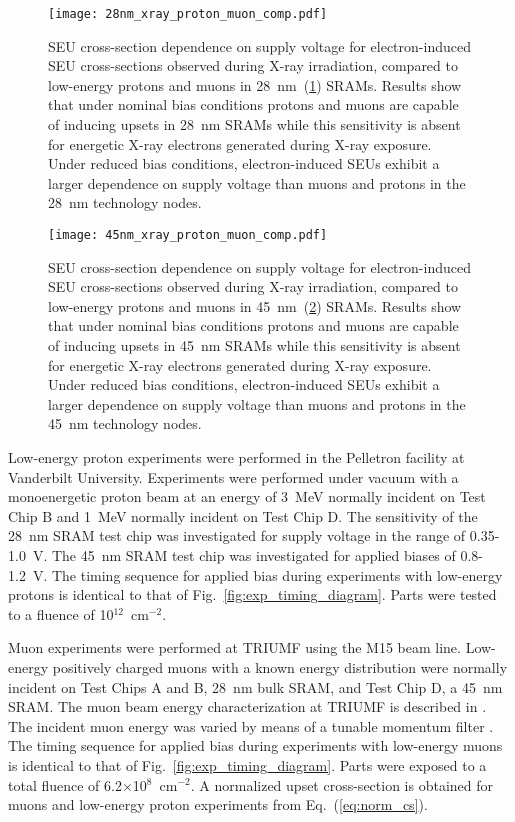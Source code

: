 \begin{figure}[tb]
    \begin{center}
        \texttt{[image: 28nm\_xray\_proton\_muon\_comp.pdf]}
    \end{center}
    \caption{SEU cross-section dependence on supply voltage for electron-induced SEU cross-sections observed during X-ray irradiation, compared to low-energy protons and muons in 28~nm~(\ref{fig:28nm_xray_muon_proton}) SRAMs. Results show that under nominal bias conditions protons and muons are capable of inducing upsets in 28~nm SRAMs while this sensitivity is absent for energetic X-ray electrons generated during X-ray exposure. Under reduced bias conditions, electron-induced SEUs exhibit a larger dependence on supply voltage than muons and protons in the 28~nm technology nodes.}
    \label{fig:28nm_xray_muon_proton}
\end{figure}
\begin{figure}[tb]
    \begin{center}
        \texttt{[image: 45nm\_xray\_proton\_muon\_comp.pdf]}
    \end{center}
    \caption{SEU cross-section dependence on supply voltage for electron-induced SEU cross-sections observed during X-ray irradiation, compared to low-energy protons and muons in 45~nm~(\ref{fig:45nm_xray_muon_proton}) SRAMs. Results show that under nominal bias conditions protons and muons are capable of inducing upsets in 45~nm SRAMs while this sensitivity is absent for energetic X-ray electrons generated during X-ray exposure. Under reduced bias conditions, electron-induced SEUs exhibit a larger dependence on supply voltage than muons and protons in the 45~nm technology nodes.}
    \label{fig:45nm_xray_muon_proton}
\end{figure}

Low-energy proton experiments were performed in the Pelletron facility at Vanderbilt University. 
Experiments were performed under vacuum with a monoenergetic proton beam at an energy of 3~MeV normally incident on Test Chip B and 1~MeV normally incident on Test Chip D. 
The sensitivity of the 28~nm SRAM test chip was investigated for supply voltage in the range of 0.35-1.0~V. 
The 45~nm SRAM test chip was investigated for applied biases of 0.8-1.2~V. 
The timing sequence for applied bias during experiments with low-energy protons is identical to that of Fig.~\ref{fig:exp_timing_diagram}. 
Parts were tested to a fluence of 10$^{12}$~cm$^{-2}$.

Muon experiments were performed at TRIUMF using the M15 beam line. 
Low-energy positively charged muons with a known energy distribution were normally incident on Test Chips A and B, 28~nm bulk SRAM, and Test Chip D, a 45~nm SRAM. 
The muon beam energy characterization at TRIUMF is described in \cite{Sierawski:2010cj}. 
The incident muon energy was varied by means of a tunable momentum filter \cite{Sierawski:2010cj, Sierawski:2011bn}. 
The timing sequence for applied bias during experiments with low-energy muons is identical to that of Fig.~\ref{fig:exp_timing_diagram}.
Parts were exposed to a total fluence of 6.2$\times$10$^8$~cm$^{-2}$. A normalized upset cross-section is obtained for muons and low-energy proton experiments from Eq.~(\ref{eq:norm_cs}).

